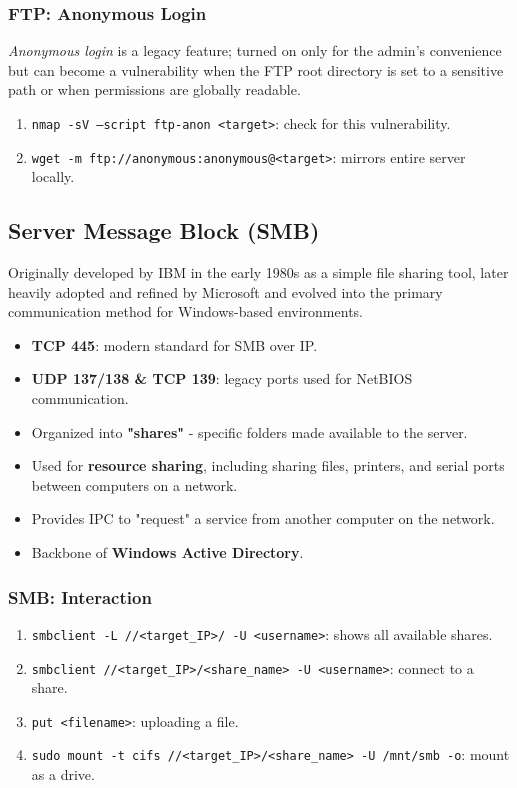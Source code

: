 \documentclass[12pt, letterpaper]{article}
\begin{document}
\subsubsection*{FTP: Anonymous Login}

\textit{Anonymous login} is a legacy feature; turned on only for the admin's convenience but can become a vulnerability when the FTP root directory is set to a sensitive path or when permissions are globally readable.

\begin{enumerate}
    \item \texttt{nmap -sV --script ftp-anon <target>}: check for this vulnerability.
    \item \texttt{wget -m ftp://anonymous:anonymous@<target>}: mirrors entire server locally.
\end{enumerate}

\subsection*{Server Message Block (SMB)}

Originally developed by IBM in the early 1980s as a simple file sharing tool, later heavily adopted and refined by Microsoft and evolved into the primary communication method for Windows-based environments.

\begin{itemize}
    \item \textbf{TCP 445}: modern standard for SMB over IP.
    \item \textbf{UDP 137/138 \& TCP 139}: legacy ports used for NetBIOS communication.
    \item Organized into \textbf{"shares"} - specific folders made available to the server.
    \item Used for \textbf{resource sharing}, including sharing files, printers, and serial ports between computers on a network.
    \item Provides IPC to "request" a service from another computer on the network.
    \item Backbone of \textbf{Windows Active Directory}.
\end{itemize}

\subsubsection*{SMB: Interaction}

\begin{enumerate}
    \item \texttt{smbclient -L //<target\_IP>/ -U <username>}: shows all available shares.
    \item \texttt{smbclient //<target\_IP>/<share\_name> -U <username>}: connect to a share.
    \item \texttt{put <filename>}: uploading a file.
    \item \texttt{sudo mount -t cifs //<target\_IP>/<share\_name> -U /mnt/smb -o}: mount as a drive.
\end{enumerate}
\end{document}
